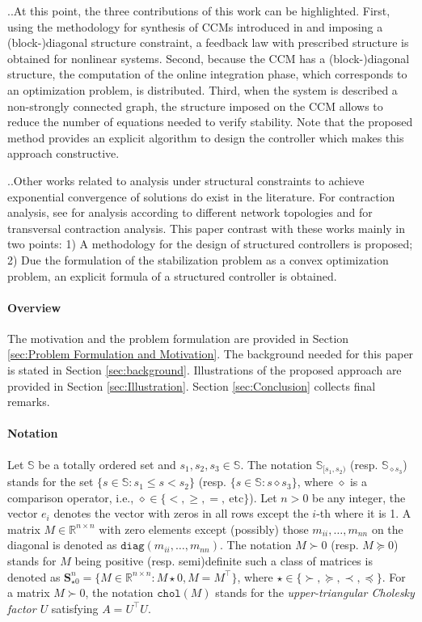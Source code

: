 \documentclass[10pt,twocolumn,twoside]{IEEEtran}
\newcounter{para}
\newcommand\mypara{\par \thesection.\refstepcounter{para}\thepara.\space}
\theoremstyle{plain}
\theoremstyle{definition}
\theoremstyle{remark}
\begin{document}
\mypara At this point, the three contributions of this work can be highlighted. First, using the methodology for synthesis of CCMs introduced in \cite{Manchester2014a} and imposing a (block-)diagonal structure constraint, a feedback law with prescribed structure is obtained for nonlinear systems. Second, because the CCM has a (block-)diagonal structure, the computation of the online integration phase, which corresponds to an optimization problem, is distributed. Third, when the system is described a non-strongly connected graph, the structure imposed on the CCM allows to reduce the number of equations needed to  verify stability. Note that the proposed method provides an explicit algorithm to design the controller which makes this approach constructive.

\mypara Other works related to analysis under structural constraints to achieve exponential convergence of solutions do exist in the literature. For contraction analysis, see \cite{Aminzare2014a} for analysis according to different network topologies and \cite{Andrieu2016} for transversal contraction analysis. This paper contrast with these works mainly in two points: 1) A  methodology for the design of structured controllers is proposed; 2) Due the formulation of the stabilization problem as a convex optimization problem, an explicit formula of a structured controller is obtained.

\paragraph{Overview} The motivation and the problem formulation are provided in Section \ref{sec:Problem Formulation and Motivation}. The background needed for this paper is stated in Section \ref{sec:background}. Illustrations of the proposed approach are provided in Section \ref{sec:Illustration}. Section \ref{sec:Conclusion} collects final remarks.

\paragraph{Notation} Let $\mathbb{S}$ be a totally ordered set and $s_1,s_2,s_3\in\mathbb{S}$. The notation $\mathbb{S}_{[s_1,s_2)}$ (resp. $\mathbb{S}_{\diamond s_3}$) stands for the set $\{s\in\mathbb{S}:s_1\leq s< s_2\}$ (resp. $\{s\in\mathbb{S}:s\diamond s_3\}$, where $\diamond$ is a comparison operator, i.e., $\diamond\in\{<,\geq,=,\ \text{etc}\}$). Let $n>0$ be any integer, the vector $e_i$ denotes the vector with zeros in all rows except the $i$-th where it is 1. A matrix $M\in\mathbb{R}^{n\times n}$ with zero elements except (possibly) those  $m_{ii},\ldots,m_{nn}$ on the diagonal is denoted as $\mathbin{\mathtt{diag}}(m_{ii},\ldots,m_{nn})$. The notation $M\succ 0$ (resp. $M\succeq 0$) stands for $M$ being positive (resp. semi)definite such a class of matrices is denoted as $\mathbf{S}_{\star0}^n=\{M\in\mathbb{R}^{n\times n}:M\star0,M=M^\top\}$, where $\star\in\{\succ,\succeq,\prec,\preceq\}$. For a matrix $M\succ0$, the notation $\mathbin{\mathtt{chol}}(M)$ stands for the \emph{upper-triangular Cholesky factor $U$} satisfying $A=U^\top U$.
\end{document}
